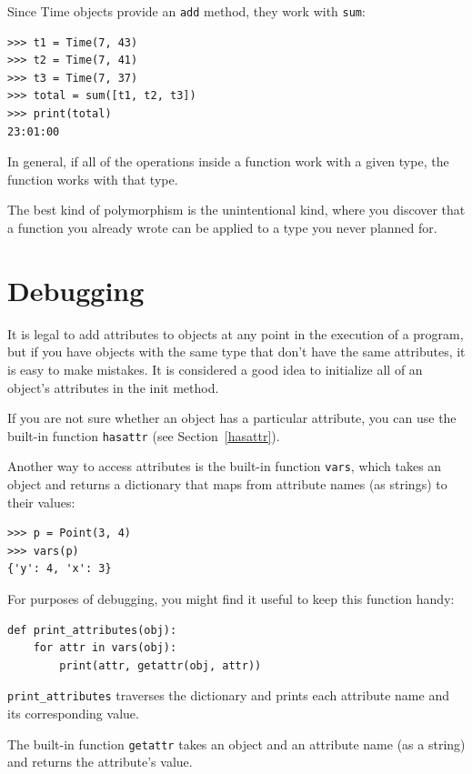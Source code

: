 \documentclass[10pt]{book}
\begin{document}
Since Time objects provide an {\tt add} method, they work
with {\tt sum}:

\begin{verbatim}
>>> t1 = Time(7, 43)
>>> t2 = Time(7, 41)
>>> t3 = Time(7, 37)
>>> total = sum([t1, t2, t3])
>>> print(total)
23:01:00
\end{verbatim}
%
In general, if all of the operations inside a function 
work with a given type, the function works with that type.

The best kind of polymorphism is the unintentional kind, where
you discover that a function you already wrote can be
applied to a type you never planned for.


\section{Debugging}

It is legal to add attributes to objects at any point in the execution
of a program, but if you have objects with the same type that don't
have the same attributes, it is easy to make mistakes.
It is considered a good idea to
initialize all of an object's attributes in the init method.

If you are not sure whether an object has a particular attribute, you
can use the built-in function {\tt hasattr} (see Section~\ref{hasattr}).

Another way to access attributes is the built-in function {\tt vars},
which takes an object and returns a dictionary that maps from
attribute names (as strings) to their values:

\begin{verbatim}
>>> p = Point(3, 4)
>>> vars(p)
{'y': 4, 'x': 3}
\end{verbatim}
%
For purposes of debugging, you might find it useful to keep this
function handy:

\begin{verbatim}
def print_attributes(obj):
    for attr in vars(obj):
        print(attr, getattr(obj, attr))
\end{verbatim}
%
\verb"print_attributes" traverses the dictionary
and prints each attribute name and its corresponding value.

The built-in function {\tt getattr} takes an object and an attribute
name (as a string) and returns the attribute's value.
\end{document}
